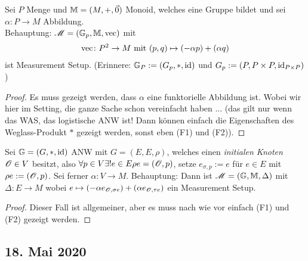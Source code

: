 \begin{problem}
    Sei $P$ Menge und $\mathbb{M} = (M, +, \vec{0})$ Monoid, welches eine Gruppe bildet und sei $\alpha \colon P \to M$ Abbildung.\\
    Behauptung: $\operatorname{\mathscr M} = (\mathbb{G}_p, \mathbb{M}, \operatorname{vec})$ mit 
    \begin{align*}
        \operatorname{vec} \colon P^2 \to M \text{ mit } (p,q) \mapsto (-\alpha p) + (\alpha q)
    \end{align*}
    ist Measurement Setup. (Erinnere: $\mathbb{G}_P := (G_p, \ast, \operatorname{id})$ und $G_p := (P, P\times P, \operatorname{id}_{P\times P})$)
    \begin{proof}
        Es muss gezeigt werden, dass $\alpha$ eine funktorielle Abbildung ist. Wobei wir hier im Setting, die ganze Sache schon vereinfacht haben ... (das gilt nur wenn das WAS, das logistische ANW ist! Dann können einfach die Eigenschaften des Weglass-Produkt $\ast$ gezeigt werden, sonst eben (F1) und (F2)). 
    \end{proof}
\end{problem}
\begin{problem}
    Sei $\mathbb{G} = (G,\ast, \operatorname{id})$ ANW mit $G = (E, E, \rho)$, welches einen \emph{initialen Knoten} $\mathscr O \in V$ besitzt, also $\forall p \in V \exists! e \in E \rho e = (\mathscr O,p)$, setze $e_{\sigma,p} := e$ für $e \in E$ mit $\rho e := (\mathscr O, p)$. Sei ferner $\alpha\colon V \to M$.
    Behauptung: Dann ist $\operatorname{\mathscr M}= (\mathbb{G},\mathbb{M},\Delta)$ mit $\Delta\colon E \to M$ wobei $e \mapsto (-\alpha e_{\mathscr O,\sigma e}) + (\alpha e_{\mathscr O,\tau e})$ ein Measurement Setup.
    \begin{proof}
        Dieser Fall ist allgemeiner, aber es muss nach wie vor einfach (F1) und (F2) gezeigt werden. 
    \end{proof}
\end{problem}
\subsection*{18. Mai 2020}